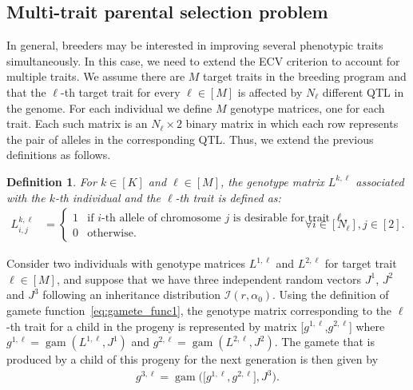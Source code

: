 \documentclass[12pt, a4paper, bibliography=totoc]{scrartcl}
\newtheorem{definition}{Definition}
\DeclareMathOperator*{\gam}{gam}
\newcommand{\Iscr}{\mathcal{I}}
\begin{document}
\subsection*{Multi-trait parental selection problem}
\label{subsec:multi-trait}

In general, breeders may be interested in improving several phenotypic traits simultaneously. In this case, we need to extend the ECV criterion to account for multiple traits. We assume there are $M$ target traits in the breeding program and that the $\ell$-th target trait for every $\ell\in[M]$ is affected by $N_{\ell}$ different QTL in the genome. For each individual we define $M$ genotype matrices, one for each trait. Each such matrix is an $N_{\ell}\times 2$ binary matrix in which each row represents the pair of alleles in the corresponding QTL. Thus, we extend the previous definitions as follows.

\begin{definition}\label{defn.genotype_matrix_multi-trait}
 For $k \in [K]$ and $\ell \in [M]$, the genotype matrix $L^{k,\ell}$ associated with the $k$-th individual and the $\ell$-th trait is defined as:
		\begin{align} \label{eq:genotype_matrix_multi-trait}
		L^{k,\ell}_{i,j} &=
		\left\{
		\begin{array}{ll}
		1 & \text{if $i$-th allele of chromosome $j$ is desirable for trait $\ell$,}\\
		0 & \text{otherwise.} 
		\end{array}
		\right.  & \forall i \in [N_{\ell}], j \in [2].
		\end{align}
\end{definition}
Consider two individuals with genotype matrices $L^{1,\ell}$ and $L^{2,\ell}$ for target trait $\ell\in[M]$, and suppose that we have three independent random vectors $J^1$, $J^2$ and $J^3$ following an inheritance distribution $\Iscr(r,\alpha_0)$. Using the definition of  gamete function~\eqref{eq:gamete_func1}, the genotype matrix corresponding to the $\ell$-th trait for a child in the progeny is represented by matrix [$g^{1,\ell}$,$g^{2,\ell}$] where $g^{1,\ell} = \gam(L^{1,\ell},J^1)$ and $g^{2,\ell} = \gam(L^{2,\ell},J^2)$. The gamete that is produced by a child of this progeny for the next generation is then given by
\begin{align} \label{eq:gamete_g3_multi-trait}
  g^{3,\ell} = \gam\big(\big[g^{1,\ell}, g^{2,\ell}\big],J^3\big).
\end{align}
\end{document}

